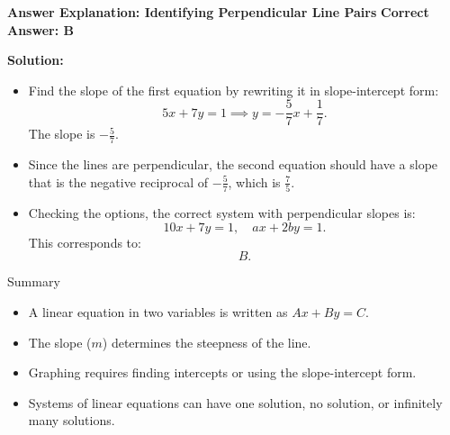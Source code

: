 \documentclass{beamer}
\begin{document}
\begin{frame}{\textbf{Answer Explanation: Identifying Perpendicular Line Pairs}}
    \textbf{Correct Answer: \textcolor{novelPurple}{B}}  

    \vspace{0.3cm}
    \textbf{Solution:}
    \begin{itemize}
        \item Find the slope of the first equation by rewriting it in slope-intercept form:
        \[
        5x + 7y = 1 \implies y = -\frac{5}{7}x + \frac{1}{7}.
        \]
        The slope is \( -\frac{5}{7} \).
        
        \item Since the lines are perpendicular, the second equation should have a slope that is the negative reciprocal of \( -\frac{5}{7} \), which is \( \frac{7}{5} \).

        \item Checking the options, the correct system with perpendicular slopes is:
        \[
        10x + 7y = 1, \quad ax + 2by = 1.
        \]
        This corresponds to:
        \[
        \boxed{B.}
        \]
    \end{itemize}
\end{frame}






\begin{frame}{Summary}
    \begin{itemize}
        \item A linear equation in two variables is written as \( Ax + By = C \).
        \item The slope (\( m \)) determines the steepness of the line.
        \item Graphing requires finding intercepts or using the slope-intercept form.
        \item Systems of linear equations can have one solution, no solution, or infinitely many solutions.
    \end{itemize}
\end{frame}
\end{document}
